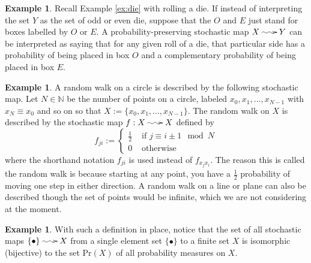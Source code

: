 \documentclass[12pt]{article}
\makeatletter
\theoremstyle{theorem}
\theoremstyle{definition}
\newtheorem{example}[equation]{Example}
\numberwithin{equation}{section}
\newcommand{\be}{\begin{equation}}
\newcommand{\ee}{\end{equation}}
\newcommand{\bx}{\begin{example}}
\newcommand{\ex}{\end{example}}
\newcommand{\<}{\langle}
\renewcommand{\>}{\rangle}
\def\N{{{\mathbb N}}}
\newcommand{\stoch}{\;\xy0;/r.25pc/:\ar@{~>}(3,0);(-3,0);\endxy\;}
\makeatother
\begin{document}
\bx
Recall Example \ref{ex:die} with rolling a die. If instead of 
interpreting the set $Y$ as the set of odd or even die, suppose
that the $O$ and $E$ just stand for boxes labelled by $O$ or $E.$ 
A probability-preserving stochastic map $X\stoch Y$ can be interpreted
as saying that for any given roll of a die, that particular side has a 
probability of being placed in box $O$ and a complementary probability
of being placed in box $E.$ 
\ex

\bx
\label{ex:randomwalk}
A random walk on a circle is described by the following stochastic map. 
Let $N\in\N$ be the number of points on a circle, labeled 
$x_0,x_1,\dots,x_{N-1}$ with $x_{N}\equiv x_{0}$ and so on
so that $X:=\{x_0,x_1,\dots,x_{N-1}\}.$ The random walk on $X$ is
described by the stochastic map $f:X\stoch X$ defined by 
\be
f_{ji}:=
\begin{cases}
\frac{1}{2}&\mbox{ if }j\equiv i\pm1\!\!\mod N\\
0&\mbox{ otherwise}
\end{cases}
\ee
where the shorthand notation $f_{ji}$ is used instead of $f_{x_j x_i}.$ 
The reason this is called the random walk is because starting
at any point, you have a $\frac{1}{2}$ probability of moving
one step in either direction. A random walk on a line or plane 
can also be described though the set of points would be infinite, 
which we are not considering at the moment. 
\ex

\bx
\label{ex:stochasticfrominitial}
With such a definition in place, notice that the set of all stochastic maps
$\{\bullet\}\stoch X$ from a single element set $\{\bullet\}$ to a finite set $X$ is
isomorphic (bijective) 
to the set $\mathrm{Pr}(X)$ of all probability measures on $X.$
\ex
\end{document}
